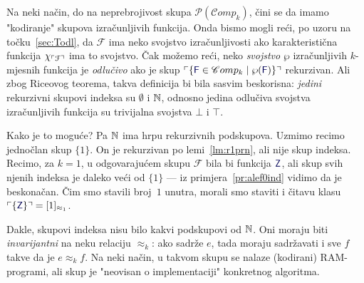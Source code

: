 Na neki način, do na neprebrojivost skupa $\mathcal P(\mathscr Comp_k)$, čini se da imamo "kodiranje" skupova izračunljivih funkcija. Onda bismo mogli reći, po uzoru na točku~\ref{sec:Todl}, da $\mathcal F$ ima neko svojstvo izračunljivosti ako karakteristična funkcija $\chi_{\ulcorner\mathcal F\urcorner}$ ima to svojstvo. Čak možemo reći, neko \emph{svojstvo} $\wp$ izračunljivih $k$-mjesnih funkcija je \emph{odlučivo} ako je skup $\kins{\{\f F\in\mathscr Comp_k\mid\wp(\f F)\}}$ rekurzivan. Ali zbog Riceovog teorema, takva definicija bi bila sasvim beskorisna: \emph{jedini} rekurzivni skupovi indeksa su $\emptyset$ i ${\mathbb N}$, odnosno jedina odlučiva svojstva izračunljivih funkcija su trivijalna svojstva $\bot$ i $\top$.


Kako je to moguće? Pa ${\mathbb N}$ ima hrpu rekurzivnih podskupova. Uzmimo recimo %
%
jednočlan skup $\{1\}$. On je rekurzivan po lemi~\ref{lm:r1prn}, ali nije skup indeksa. Recimo, za $k=1$, u odgovarajućem skupu $\mathcal F$ bila bi funkcija $\f Z$, ali skup svih njenih indeksa je daleko veći od $\{1\}$ --- iz primjera~\ref{pr:alef0ind} vidimo da je beskonačan. Čim smo stavili broj~$1$ unutra, morali smo staviti i čitavu klasu $\kins{\{\f Z\}}=[1]_{\approx_1}$.

Dakle, skupovi indeksa nisu bilo kakvi podskupovi od ${\mathbb N}$. Oni moraju biti \emph{invarijantni} na neku relaciju $\approx_k$: ako sadrže $e$, tada moraju sadržavati i sve $f$ takve da je $e\approx_k f$. Na neki način, u takvom skupu se nalaze (kodirani) RAM-programi, ali skup je "neovisan o implementaciji" konkretnog algoritma.

